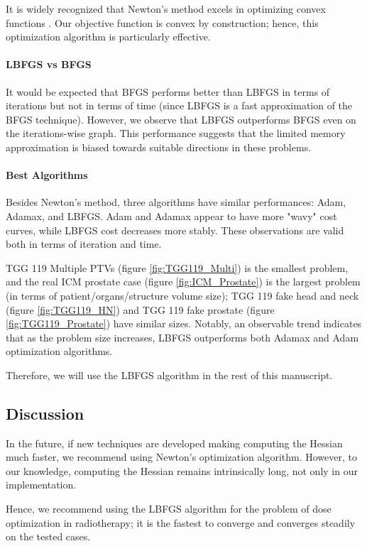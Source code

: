 It is widely recognized that Newton's method excels in optimizing convex functions \cite{PoczosTibshirani2013}.
Our objective function is convex by construction; hence, this optimization algorithm is particularly effective.

\paragraph{LBFGS vs BFGS}
It would be expected that BFGS performs better than LBFGS in terms of iterations but not in terms of time (since LBFGS is a fast approximation of the BFGS technique).
However, we observe that LBFGS outperforms BFGS even on the iterations-wise graph.
This performance suggests that the limited memory approximation is biased towards suitable directions in these problems.

\paragraph{Best Algorithms}
Besides Newton's method, three algorithms have similar performances: Adam, Adamax, and LBFGS.
Adam and Adamax appear to have more "wavy" cost curves, while LBFGS cost decreases more stably.
These observations are valid both in terms of iteration and time.

TGG 119 Multiple PTVs (figure \ref{fig:TGG119_Multi}) is the smallest problem, and the real ICM prostate case (figure \ref{fig:ICM_Prostate}) is the largest problem (in terms of patient/organs/structure volume size);
TGG 119 fake head and neck (figure \ref{fig:TGG119_HN}) and TGG 119 fake prostate (figure \ref{fig:TGG119_Prostate}) have similar sizes.
Notably, an observable trend indicates that as the problem size increases, LBFGS outperforms both Adamax and Adam optimization algorithms.

Therefore, we will use the LBFGS algorithm in the rest of this manuscript.

\subsection{Discussion}
In the future, if new techniques are developed making computing the Hessian much faster, we recommend using Newton's optimization algorithm.
However, to our knowledge, computing the Hessian remains intrinsically long, not only in our implementation.

Hence, we recommend using the LBFGS algorithm for the problem of dose optimization in radiotherapy;
it is the fastest to converge and converges steadily on the tested cases.

